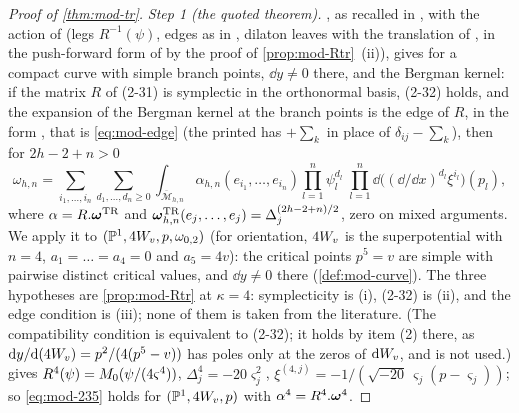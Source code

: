 \begin{proof}[Proof of \cref{thm:mod-tr}]
\emph{Step 1 (the quoted theorem).} \cite[Thm.~4.1]{DuninBarkowski:2012bw}, as recalled in \cite[\S2.6, (2-30)--(2-32), (2-34), (2-35)]{Dunin-Barkowski:2015caa}, with the action of \cite[\S2.3]{Dunin-Barkowski:2015caa} (legs $R^{-1}(\psi)$, edges as in \cite[Def.~2.2]{PPZ15}, dilaton leaves with the translation of \cite[Def.~2.13]{PPZ15}, in the push-forward form of \cite[Def.~2.5]{PPZ15} by the proof of \cref{prop:mod-Rtr}~(ii)), gives for a compact curve with simple branch points, $\dd y\neq 0$ there, and the Bergman kernel: if the matrix $R$ of (2-31) is symplectic in the orthonormal basis, (2-32) holds, and the expansion of the Bergman kernel at the branch points is the edge of $R$, in the form \cite[(4-1)]{DuninBarkowski:2012bw}, that is \eqref{eq:mod-edge} (the printed \cite[(2-33)]{Dunin-Barkowski:2015caa} has $+\sum_k$ in place of $\delta_{ij}-\sum_k$), then for $2h-2+n>0$
\begin{equation}
\label{eq:mod-235}
\omega_{h,n}=\sum_{i_1,\dots,i_n}\sum_{d_1,\dots,d_n\geq 0}\int_{\overline{\mathcal M}_{h,n}}\alpha_{h,n}(e_{i_1},\dots,e_{i_n})\prod_{l=1}^n\psi_l^{d_l}\;\prod_{l=1}^n\dd\big((\dd/\dd x)^{d_l}\xi^{i_l}\big)(p_l),
\end{equation}
where $\alpha=R.\boldsymbol{\omega}^{\mathrm{TR}}$ and $\boldsymbol{\omega}^{\mathrm{TR}}_{h,n}(e_j,\dots,e_j)=\Delta_j^{(2h-2+n)/2}$, zero on mixed arguments. We apply it to $(\mathbb{P}^1,4W_{v},p,\omega_{0,2})$ (for orientation, $4W_{v}$ is the superpotential \cite[(8-1)]{Dunin-Barkowski:2015caa} with $n=4$, $a_1=\dots=a_4=0$ and $a_5=4v$): the critical points $p^5=v$ are simple with pairwise distinct critical values, and $\dd y\neq0$ there (\cref{def:mod-curve}). The three hypotheses are \cref{prop:mod-Rtr} at $\kappa=4$: symplecticity is (i), (2-32) is (ii), and the edge condition is (iii); none of them is taken from the literature. (The compatibility condition \cite[Prop.~4.3]{Dunin-Barkowski:2015caa} is equivalent to (2-32); it holds by item (2) there, as $\mathrm{d} y/\mathrm{d}(4W_{v})=p^2/(4(p^5-v))$ has poles only at the zeros of $\mathrm{d}W_{v}$, and is not used.)  gives $R^{4}(\psi)=M_{0}(\psi/(4\varsigma^4))$, $\Delta^{4}_j=-20\varsigma_j^2$, $\xi^{(4,j)}=-1/(\sqrt{-20}\,\varsigma_j(p-\varsigma_j))$; so \eqref{eq:mod-235} holds for $(\mathbb{P}^1,4W_{v},p)$ with $\alpha^{4}=R^{4}.\boldsymbol{\omega}^{4}$.


\end{proof}
